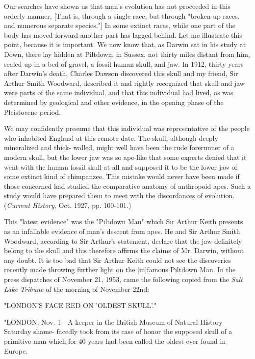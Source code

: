 Our searches have shown us that man's evolution has not proceeded in this orderly manner,
[That is, through a single race, but through "broken up races, and numerous separate
species."] In some extinct races, while one part of the body has moved forward another part
has lagged behind. Let me illustrate this point, because it is important. We now know that, as
Darwin sat in his study at Down, there lay hidden at Piltdown, in Sussex, not thirty miles
distant from him, sealed up in a bed of gravel, a fossil human skull, and jaw. In 1912, thirty
years after Darwin's death, Charles Dawson discovered this skull and my friend, Sir Arthur
Smith Woodward, described it and rightly recognized that skull and jaw were parts of the
same individual, and that this individual had lived, as was determined by geological and
other evidence, in the opening phase of the Pleistocene period.

We may confidently presume that this individual was representative of the people who
inhabited England at this remote date. The skull, although deeply mineralized and thick-
walled, might well have been the rude forerunner of a modern skull, but the lower jaw was so
ape-like that some experts denied that it went with the human fossil skull at all and supposed
it to be the lower jaw of some extinct kind of chimpanzee. This mistake would never have
been made if those concerned had studied the comparative anatomy of anthropoid apes. Such
a study would have prepared them to meet with the discordances of evolution. (\textit{Current
History}, Oct. 1927, pp. 100-101.)

This "latest evidence" was the "Piltdown Man" which Sir Arthur Keith presents as an
infallable evidence of man's descent from apes. He and Sir Arthur Smith Woodward,
according to Sir Arthur's statement, declare that the jaw definitely belong to the skull and this
therefore affirms the claims of Mr. Darwin, without any doubt. It is too bad that Sir Arthur
Keith could not see the discoveries recently made throwing further light on the [in]famous
Piltdown Man. In the press dispatches of November 21, 1953, came the following copied
from the \textit{Salt Lake Tribune} of the morning of November 22nd:

"LONDON'S FACE RED ON 'OLDEST SKULL'."

"LONDON, Nov. 1—A keeper in the British Museum of Natural History Saturday shame-
facedly took from its case of honor the supposed skull of a primitive man which for 40 years
had been called the oldest ever found in Europe.


